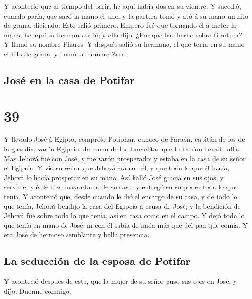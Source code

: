  Y aconteció que al tiempo del parir, he aquí había dos
en su vientre.  Y sucedió, cuando paría, que sacó la mano
el uno, y la partera tomó y ató á su mano un hilo de grana, diciendo:
Este salió primero.  Empero fué que tornando él á meter
la mano, he aquí su hermano salió; y ella dijo: ¿Por qué has hecho sobre
ti rotura? Y llamó su nombre Phares.  Y después salió su
hermano, el que tenía en su mano el hilo de grana, y llamó su nombre
Zara.

\hypertarget{josuxe9-en-la-casa-de-potifar}{%
\subsection{José en la casa de
Potifar}\label{josuxe9-en-la-casa-de-potifar}}

\hypertarget{section-01-39}{%
\section{39}\label{section-01-39}}

 Y llevado José á Egipto, comprólo Potiphar, eunuco de
Faraón, capitán de los de la guardia, varón Egipcio, de mano de los
Ismaelitas que lo habían llevado allá.  Mas Jehová fué con
José, y fué varón prosperado: y estaba en la casa de su señor el
Egipcio.  Y vió su señor que Jehová era con él, y que todo
lo que él hacía, Jehová lo hacía prosperar en su mano. 
Así halló José gracia en sus ojos, y servíale; y él le hizo mayordomo de
su casa, y entregó en su poder todo lo que tenía.  Y
aconteció que, desde cuando le dió el encargo de su casa, y de todo lo
que tenía, Jehová bendijo la casa del Egipcio á causa de José; y la
bendición de Jehová fué sobre todo lo que tenía, así en casa como en el
campo.  Y dejó todo lo que tenía en mano de José; ni con
él sabía de nada más que del pan que comía. Y era José de hermoso
semblante y bella presencia.

\hypertarget{la-seducciuxf3n-de-la-esposa-de-potifar}{%
\subsection{La seducción de la esposa de
Potifar}\label{la-seducciuxf3n-de-la-esposa-de-potifar}}

 Y aconteció después de esto, que la mujer de su señor
puso sus ojos en José, y dijo: Duerme conmigo.

